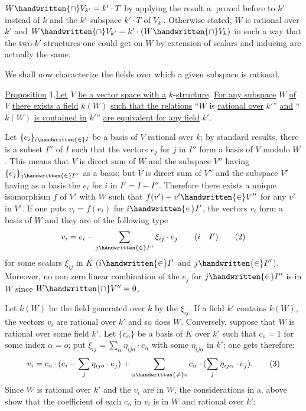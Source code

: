 
$W\handwritten{\cap}V_{k'}=k'\cdot T$ by applying the result a. proved before to $k'$ instead of $k$ and the $k'$-subspace $k'\cdot T$ of $V_{k'}$. Otherwise stated, $W$ is rational over $k'$ and $W\handwritten{\cap}V_{k'}=k'\cdot(W\handwritten{\cap}V_k)$ in such a way that the two $k'$-structures one could get on $W$ by extension of scalars and inducing are actually the same.

We shall now characterize the fields over which a given subspace is rational.

\uline{Proposition} 1.\quad \uline{Let} $V$ \uline{be a vector space with a} $k$-\uline{structure}. \uline{For any subspace} $W$ \uline{of} $V$ \uline{there exists a field} $k(W)$ \uline{such that the relations} ``$W$ is \uline{rational over} $k'$'' \uline{and} ``$k(W)$ \uline{is contained in} $k'$'' \uline{are equivalent for any field} $k'$.

Let $\{e_i\}_{i\handwritten{\in}I}$ be a basis of $V$ rational over $k$; by standard results, there is a subset $I''$ of $I$ such that the vectors $e_j$ for $j$ in $I''$ form a basis of $V$ modulo $W$. This means that $V$ is direct sum of $W$ and the subspace $V''$ having $\{e_j\}_{j\handwritten{\in}I''}$ as a basis; but $V$ is direct sum of $V''$ and the subspace $V'$ having as a basis the $e_i$ for $i$ in $I'=I-I''$. Therefore there exists a unique isomorphism $f$ of $V'$ with $W$ such that $f(v')-v'\handwritten{\in}V''$ for any $v'$ in $V'$. If one puts $v_i=f(e_i)$ for $i\handwritten{\in}I'$, the vectors $v_i$ form a basis of $W$ and they are of the following type
\margin{\handwritten{\unsure{!|;}}}
\[
v_i=e_i-\sum_{j\handwritten{\in}I''}\xi_{ij}\cdot e_j\qquad(i\quad I')
\tag*{(2)}
\]
for some scalars $\xi_{ij}$ in $K$ ($i\handwritten{\in}I'$ and $j\handwritten{\in}I''$). Moreover, no non zero linear combination of the $e_j$ for $j\handwritten{\in}I''$ is in $W$ since $W\handwritten{\cap}V''=0$.

Let $k(W)$ be the field generated over $k$ by the $\xi_{ij}$. If a field $k'$ contains $k(W)$, the vectors $v_i$ are rational over $k'$ and so does $W$. Conversely, suppose that $W$ is rational over some field $k'$. Let $\{c_\alpha\}$ be a basis of $K$ over $k'$ such that $c_o=1$ for some index $\alpha=o$; put $\xi_{ij}=\sum\limits_\alpha\eta_{ij\alpha}\cdot c_\alpha$ with some $\eta_{ij\alpha}$ in $k'$; one gets therefore:
\[
v_i=c_o\cdot(e_i-\sum_j\eta_{ijo}\cdot e_j)+\sum_{\alpha\handwritten{\ne}o}c_\alpha\cdot(\sum_j\eta_{ij\alpha}\cdot e_j).
\tag*{(3)}
\]
Since $W$ is rational over $k'$ and the $v_i$ are in $W$, the considerations in a. above show that the coefficient of each $c_\alpha$ in $v_i$ is in $W$ and rational over $k'$;

